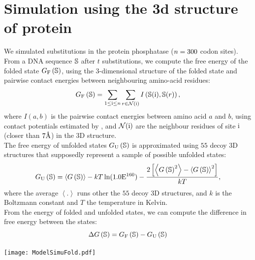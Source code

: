 \section{Simulation using the 3d structure of protein}
\label{sec:simulation-using-the-3d-structure-of-protein}

We simulated substitutions in the protein phosphatase ($n=300$ codon sites).
From a \acrshort{DNA} sequence $\mathbb{S}$ after $t$ substitutions, we compute the free energy of the folded state $G_{\textrm{F}} \left(\mathbb{S}\right)$, using the $3$-dimensional structure of the folded state and pairwise contact energies between neighbouring amino-acid residues:
\begin{equation}
G_{\textrm{F}} \left(\mathbb{S}\right) = \sum\limits_{1 \leq \text{i} \leq n} \sum\limits_{r \in \mathcal{N}(\text{i})} I \left(\mathbb{S}(\text{i}), \mathbb{S}(r) \right),
\end{equation}
where $I(a,b)$ is the pairwise contact energies between amino acid $a$ and $b$, using contact potentials estimated by \citet{Miyazawa1985}, and $\mathcal{N}(\text{i})$ are the neighbour residues of site $\text{i}$ (closer than $7\text{\normalfont\AA}$) in the $3$D structure.\\
The free energy of unfolded states $G_{\textrm{U}} \left(\mathbb{S}\right)$ is approximated using $55$ decoy $3$D structures that supposedly represent a sample of possible unfolded states:
\begin{equation}
G_{\textrm{U}} \left(\mathbb{S}\right) = \left\langle G\left(\mathbb{S}\right) \right\rangle - kT \ln (1.0\mathrm{E}^{160}) - \frac{2 \left[ \left\langle G\left(\mathbb{S}\right)^2 \right\rangle - \left\langle G\left(\mathbb{S}\right) \right\rangle^2\right] }{kT},
\end{equation}
where the average $\left\langle . \right\rangle$ runs other the $55$ decoy $3$D structures, and $k$ is the Boltzmann constant and $T$ the temperature in Kelvin.\\
From the energy of folded and unfolded states, we can compute the difference in free energy between the states:
\begin{equation}
\Delta G\left(\mathbb{S}\right) = G_{\textrm{F}} \left(\mathbb{S}\right) - G_{\textrm{U}} \left(\mathbb{S}\right)
\end{equation}
\begin{center}
 \texttt{[image: ModelSimuFold.pdf]}
\end{center}

